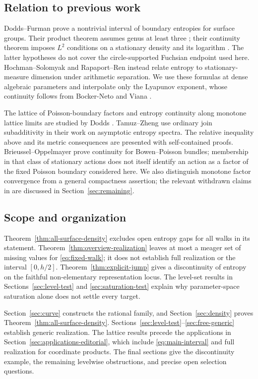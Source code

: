 \documentclass[11pt,letterpaper]{amsart}
\theoremstyle{definition}
\theoremstyle{remark}
\numberwithin{equation}{section}
\begin{document}
\subsection{Relation to previous work}
Dodds--Furman \cite[Theorem A]{DF} prove a nontrivial interval of boundary
entropies for surface groups. Their product theorem assumes genus at
least three \cite[Theorem B]{DF}; their continuity theorem imposes
$L^2$ conditions on a stationary density and its logarithm
\cite[Theorem 4.1]{DF}. The latter hypotheses do not cover the
circle-supported Fuchsian endpoint used here. Hochman--Solomyak
\cite{HS} and Rapaport--Ren \cite{RR} instead relate entropy to
stationary-measure dimension under arithmetic separation. We use these
formulas at dense algebraic parameters and interpolate only the Lyapunov
exponent, whose continuity follows from Bocker-Neto and Viana \cite{BV}.

The lattice of Poisson-boundary factors and entropy continuity along
monotone lattice limits are studied by Dodds \cite{Dodds}.
Tamuz--Zheng \cite[Section 4]{TZ} use ordinary join subadditivity in
their work on asymptotic entropy spectra. The relative inequality above
and its metric consequences are presented with self-contained proofs.
Brieussel--Oppelmayer \cite{BO} prove continuity for Bowen--Poisson
bundles; membership in that class of stationary actions does not itself
identify an action as a factor of the fixed Poisson boundary considered
here. We also distinguish monotone factor convergence from a general
compactness assertion; the relevant withdrawn claims in \cite{BT,BLT}
are discussed in Section~\ref{sec:remaining}.

\subsection{Scope and organization}
Theorem~\ref{thm:all-surface-density} excludes open entropy gaps for all
walks in its statement. Theorem~\ref{thm:overview-realization} leaves at
most a meager set of missing values for \eqref{eq:fixed-walk}; it does
not establish full realization or the interval $[0,h/2]$.
Theorem~\ref{thm:explicit-jump} gives a discontinuity of entropy on the
faithful non-elementary representation locus. The level-set results in
Sections~\ref{sec:level-test} and \ref{sec:saturation-test} explain why
parameter-space saturation alone does not settle every target.

Section~\ref{sec:curve} constructs the rational family, and
Section~\ref{sec:density} proves Theorem~\ref{thm:all-surface-density}.
Sections~\ref{sec:level-test}--\ref{sec:free-generic} establish generic
realization. The lattice results precede the applications in
Section~\ref{sec:applications-editorial}, which include
\eqref{eq:main-interval} and full realization for coordinate products.
The final sections give the discontinuity example, the remaining
levelwise obstructions, and precise open selection questions.
\end{document}

